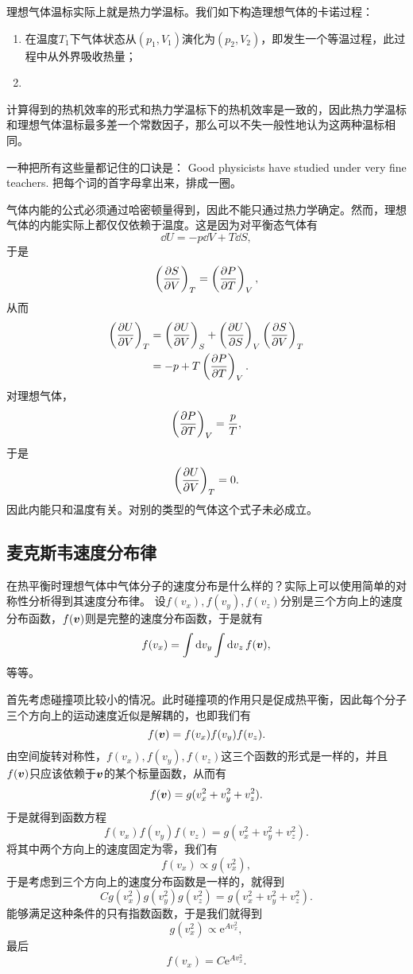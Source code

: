 \documentclass[hyperref, UTF8, a4paper]{ctexart}
\newcommand*{\ee}{\mathrm{e}}
\begin{document}
理想气体温标实际上就是热力学温标。我们如下构造理想气体的卡诺过程：
\begin{enumerate}
    \item 在温度$T_1$下气体状态从$(p_1, V_1)$演化为$(p_2, V_2)$，即发生一个等温过程，此过程中从外界吸收热量；
    \item 
\end{enumerate}

计算得到的热机效率的形式和热力学温标下的热机效率是一致的，因此热力学温标和理想气体温标最多差一个常数因子，那么可以不失一般性地认为这两种温标相同。

一种把所有这些量都记住的口诀是：
Good physicists have studied under very fine teachers.
把每个词的首字母拿出来，排成一圈。

气体内能的公式必须通过哈密顿量得到，因此不能只通过热力学确定。然而，理想气体的内能实际上都仅仅依赖于温度。这是因为对平衡态气体有
\[
    \dd{U} = - p \dd{V} + T \dd{S},
\]
于是
\[
    \left(\pdv{S}{V}\right)_T = \left(\pdv{P}{T}\right)_V,
\]
从而
\[
    \begin{aligned}
        \left(\pdv{U}{V}\right)_T &= \left(\pdv{U}{V}\right)_S + \left(\pdv{U}{S}\right)_V \left(\pdv{S}{V}\right)_T \\
        &= - p + T \left(\pdv{P}{T}\right)_V.
    \end{aligned}
\]
对理想气体，
\[
    \left(\pdv{P}{T}\right)_V = \frac{p}{T},
\]
于是
\[
    \left(\pdv{U}{V}\right)_T = 0.
\]
因此内能只和温度有关。对别的类型的气体这个式子未必成立。

\subsection{麦克斯韦速度分布律}

在热平衡时理想气体中气体分子的速度分布是什么样的？实际上可以使用简单的对称性分析得到其速度分布律。
设$f(v_x),f(v_y),f(v_z)$分别是三个方向上的速度分布函数，$f(\vb*{v})$则是完整的速度分布函数，于是就有
\[
    f(v_x) = \int \dd{v_y} \int \dd{v_z} f(\vb*{v}),
\]
等等。

首先考虑碰撞项比较小的情况。此时碰撞项的作用只是促成热平衡，因此每个分子三个方向上的运动速度近似是解耦的，也即我们有
\[
    f(\vb*{v}) = f(v_x) f(v_y) f(v_z).
\]
由空间旋转对称性，$f(v_x),f(v_y),f(v_z)$这三个函数的形式是一样的，并且$f(\vb*{v})$只应该依赖于$\vb*{v}$的某个标量函数，从而有
\[
    f(\vb*{v}) = g(v_x^2+v_y^2+v_z^2).
\]
于是就得到函数方程
\[
    f(v_x) f(v_y) f(v_z) = g(v_x^2+v_y^2+v_z^2).
\]
将其中两个方向上的速度固定为零，我们有
\[
    f(v_x) \propto g(v_x^2),
\]
于是考虑到三个方向上的速度分布函数是一样的，就得到
\[
    C g(v_x^2) g(v_y^2) g(v_z^2) = g(v_x^2+v_y^2+v_z^2).
\]
能够满足这种条件的只有指数函数，于是我们就得到
\[
    g(v_x^2) \propto \ee^{A v_x^2},
\]
最后
\[
    f(v_x) = C \ee^{A v_x^2}.
\]
\end{document}
